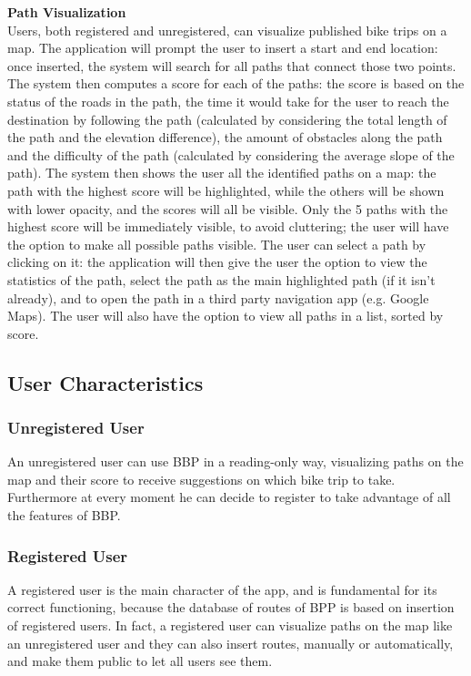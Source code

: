 \newline
\textbf{Path Visualization} \\
Users, both registered and unregistered, can visualize published bike trips on a map. The application will 
prompt the user to insert a start and end location: once inserted, the system will search for all paths that 
connect those two points. The system then computes a score for each of the paths: the score is based on the 
status of the roads in the path, the time it would take for the user to reach the destination by following 
the path (calculated by considering the total length of the path and the elevation difference), the amount of 
obstacles along the path and the difficulty of the path (calculated by considering the average slope of the 
path). The system then shows the user all the identified paths on a map: the path with the highest score will 
be highlighted, while the others will be shown with lower opacity, and the scores will all be visible. Only 
the 5 paths with the highest score will be immediately visible, to avoid cluttering; the user will have the 
option to make all possible paths visible. The user can select a path by clicking on it: the application will 
then give the user the option to view the statistics of the path, select the path as the main highlighted path 
(if it isn't already), and to open the path in a third party navigation app (e.g. Google Maps). The user will 
also have the option to view all paths in a list, sorted by score.

\subsection{User Characteristics}
\subsubsection*{Unregistered User}
An unregistered user can use BBP in a reading-only way, visualizing paths on the map and their score to receive suggestions on which bike trip to take. 
Furthermore at every moment he can decide to register to take advantage of all the features of BBP.

\subsubsection*{Registered User}
A registered user is the main character of the app, and is fundamental for its correct functioning, because the database of routes of BPP is based on insertion of registered users. 
In fact, a registered user can visualize paths on the map like an unregistered user and they can also insert routes, manually or automatically, and make them public to let all users see them.


